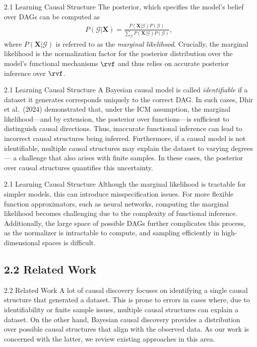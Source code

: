 \documentclass[aspectratio=169,10pt]{beamer}
\begin{document}
\begin{frame}{2.1 Learning Causal Structure}
The posterior, which specifies the model's belief over DAGs can be computed as
\begin{align*}
	P(\mathcal{G} | \mathbf{X}) = \frac{P(\mathbf{X} | \mathcal{G})P(\mathcal{G})}{\sum_{\mathcal{G}} P(\mathbf{X}|\mathcal{G})P(\mathcal{G})},
\end{align*}
where $P(\mathbf{X} | \mathcal{G})$ is referred to as the \textit{marginal likelihood}. Crucially, the marginal likelihood is the normalization factor for the posterior distribution over the model's functional mechanisms $\rvf$ and thus relies on accurate posterior inference over $\rvf$.
\end{frame}

\begin{frame}{2.1 Learning Causal Structure}
\small
A Bayesian causal model is called \textit{identifiable} if a dataset it generates corresponds uniquely to the correct DAG. In such cases, Dhir et al.\ (2024) demonstrated that, under the ICM assumption, the marginal likelihood---and by extension, the posterior over functions---is sufficient to distinguish causal directions. Thus, inaccurate functional inference can lead to incorrect causal structures being inferred. Furthermore, if a causal model is not identifiable, multiple causal structures may explain the dataset to varying degrees --- a challenge that also arises with finite samples. In these cases, the posterior over causal structures quantifies this uncertainty.
\end{frame}

\begin{frame}{2.1 Learning Causal Structure}
Although the marginal likelihood is tractable for simpler models, this can introduce misspecification issues. For more flexible function approximators, such as neural networks, computing the marginal likelihood becomes challenging due to the complexity of functional inference. Additionally, the large space of possible DAGs further complicates this process, as the normalizer is intractable to compute, and sampling efficiently in high-dimensional spaces is difficult.
\end{frame}

\subsection{2.2 Related Work}

\begin{frame}{2.2 Related Work}
A lot of causal discovery focuses on identifying a single causal structure that generated a dataset. This is prone to errors in cases where, due to identifiability or finite sample issues, multiple causal structures can explain a dataset. On the other hand, Bayesian causal discovery provides a distribution over possible causal structures that align with the observed data. As our work is concerned with the latter, we review existing approaches in this area.
\end{frame}
\end{document}
